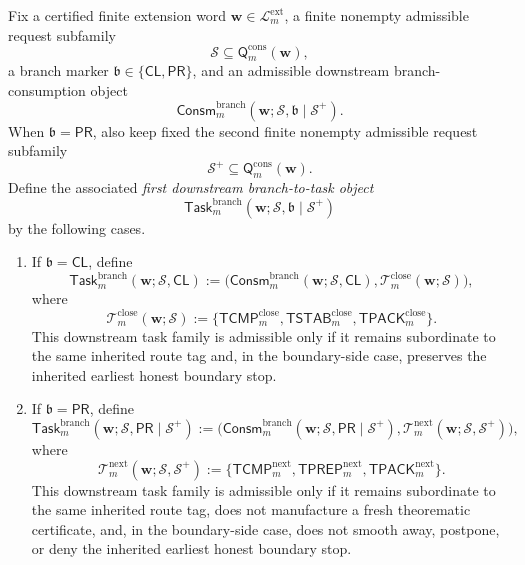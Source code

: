 \begin{definition}
\label{def:first-downstream-branch-to-task-object}
Fix a certified finite extension word \(\mathbf w\in\mathcal L^{\mathrm{ext}}_{m}\), a finite nonempty admissible request subfamily
\[
  \mathcal S \subseteq \mathsf{Q}^{\mathrm{cons}}_{m}(\mathbf w),
\]
a branch marker \(\mathfrak b\in\{\mathsf{CL},\mathsf{PR}\}\), and an admissible downstream branch-consumption object
\[
  \mathsf{Consm}^{\mathrm{branch}}_{m}(\mathbf w;\mathcal S,\mathfrak b\mid\mathcal S^{+}).
\]
When \(\mathfrak b=\mathsf{PR}\), also keep fixed the second finite nonempty admissible request subfamily
\[
  \mathcal S^{+}\subseteq \mathsf{Q}^{\mathrm{cons}}_{m}(\mathbf w).
\]
Define the associated \emph{first downstream branch-to-task object}
\[
  \mathsf{Task}^{\mathrm{branch}}_{m}(\mathbf w;\mathcal S,\mathfrak b\mid\mathcal S^{+})
\]
by the following cases.
\begin{enumerate}[label=(
oman*)]
  \item If \(\mathfrak b=\mathsf{CL}\), define
\[
  \mathsf{Task}^{\mathrm{branch}}_{m}(\mathbf w;\mathcal S,\mathsf{CL})
  :=
  \bigl(\mathsf{Consm}^{\mathrm{branch}}_{m}(\mathbf w;\mathcal S,\mathsf{CL}),\mathcal T^{\mathrm{close}}_{m}(\mathbf w;\mathcal S)\bigr),
\]
where
\[
  \mathcal T^{\mathrm{close}}_{m}(\mathbf w;\mathcal S)
  :=
  \{\mathsf{TCMP}^{\mathrm{close}}_{m},\mathsf{TSTAB}^{\mathrm{close}}_{m},\mathsf{TPACK}^{\mathrm{close}}_{m}\}.
\]
This downstream task family is admissible only if it remains subordinate to the same inherited route tag and, in the boundary-side case, preserves the inherited earliest honest boundary stop.

  \item If \(\mathfrak b=\mathsf{PR}\), define
\[
  \mathsf{Task}^{\mathrm{branch}}_{m}(\mathbf w;\mathcal S,\mathsf{PR}\mid\mathcal S^{+})
  :=
  \bigl(\mathsf{Consm}^{\mathrm{branch}}_{m}(\mathbf w;\mathcal S,\mathsf{PR}\mid\mathcal S^{+}),\mathcal T^{\mathrm{next}}_{m}(\mathbf w;\mathcal S,\mathcal S^{+})\bigr),
\]
where
\[
  \mathcal T^{\mathrm{next}}_{m}(\mathbf w;\mathcal S,\mathcal S^{+})
  :=
  \{\mathsf{TCMP}^{\mathrm{next}}_{m},\mathsf{TPREP}^{\mathrm{next}}_{m},\mathsf{TPACK}^{\mathrm{next}}_{m}\}.
\]
This downstream task family is admissible only if it remains subordinate to the same inherited route tag, does not manufacture a fresh theorematic certificate, and, in the boundary-side case, does not smooth away, postpone, or deny the inherited earliest honest boundary stop.
\end{enumerate}
\end{definition}

